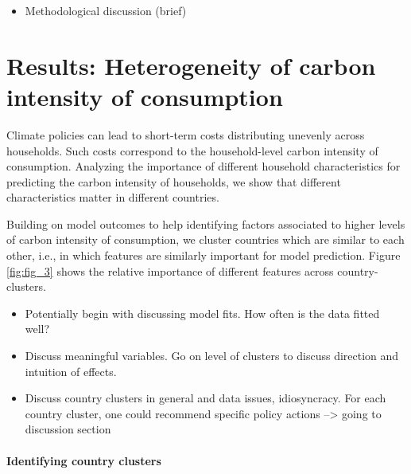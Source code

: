 \documentclass[12pt, a4paper]{article}
\begin{document}
\begin{itemize}
    \item Methodological discussion (brief)
\end{itemize}

\clearpage

\section{Results: Heterogeneity of carbon intensity of consumption} \label{sec:results}

Climate policies can lead to short-term costs distributing unevenly across households. Such costs correspond to the household-level carbon intensity of consumption. Analyzing the importance of different household characteristics for predicting the carbon intensity of households, we show that different characteristics matter in different countries.


Building on model outcomes to help identifying factors associated to higher levels of carbon intensity of consumption, we cluster countries which are similar to each other, i.e., in which features are similarly important for model prediction. Figure \ref{fig:fig_3} shows the relative importance of different features across country-clusters. 


\begin{itemize}
    \item Potentially begin with discussing model fits. How often is the data fitted well?
    \item Discuss meaningful variables. Go on level of clusters to discuss direction and intuition of effects.
    \item Discuss country clusters in general and data issues, idiosyncracy. For each country cluster, one could recommend specific policy actions --> going to discussion section
\end{itemize}

\paragraph{Identifying country clusters}
\end{document}
